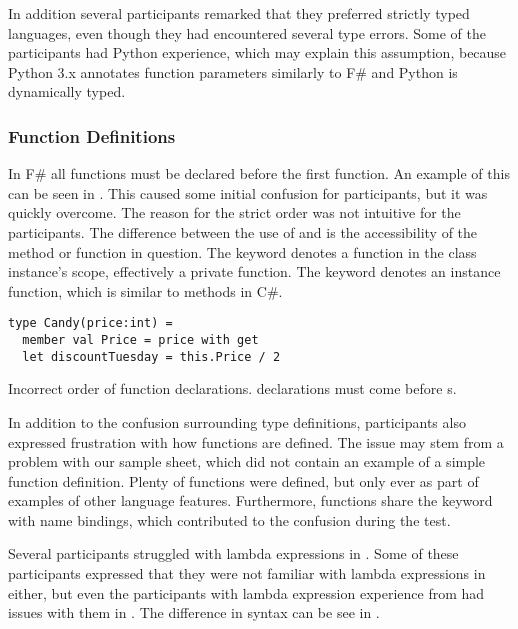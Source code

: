 In addition several participants remarked that they preferred strictly typed languages, even though they had encountered several type errors. Some of the participants had Python experience, which may explain this assumption, because Python 3.x annotates function parameters similarly to F\# and Python is dynamically typed.

\subsubsection{Function Definitions}
In F\# all  functions must be declared before the first  function. An example of this can be seen in . This caused some initial confusion for participants, but it was quickly overcome. The reason for the strict order was not intuitive for the participants. The difference between the use of  and  is the accessibility of the method or function in question. The  keyword denotes a function in the class instance's scope, effectively a private function. The  keyword denotes an instance function, which is similar to methods in C\#.

\begin{listing}[H]
\begin{verbatim}
type Candy(price:int) =
  member val Price = price with get
  let discountTuesday = this.Price / 2
\end{verbatim}
\caption{Incorrect order of function declarations.  declarations must come before s.}
\label{lst:let-mem-incor}
\end{listing}

In addition to the confusion surrounding type definitions, participants also expressed frustration with how functions are defined. The issue may stem from a problem with our sample sheet, which did not contain an example of a simple function definition. Plenty of functions were defined, but only ever as part of examples of other language features. Furthermore, functions share the  keyword with name bindings, which contributed to the confusion during the test.

Several participants struggled with lambda expressions in \fs. Some of these participants expressed that they were not familiar with lambda expressions in \cs either, but even the participants with lambda expression experience from \cs had issues with them in \fs. The difference in syntax can be see in .

